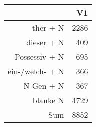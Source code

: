 \begin{tabular}{rr}
  \hline
 & V1 \\ 
  \hline
ther + N & 2286 \\ 
  dieser + N & 409 \\ 
  Possessiv + N & 695 \\ 
  ein-/welch- + N & 366 \\ 
  N-Gen + N & 367 \\ 
  blanke N & 4729 \\ 
  Sum & 8852 \\ 
   \hline
\end{tabular}
